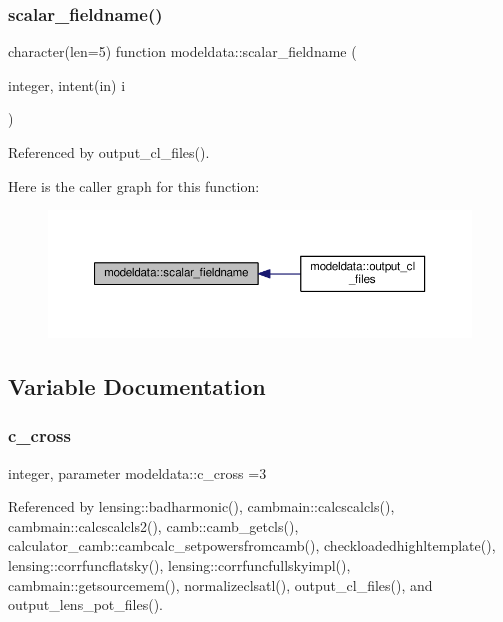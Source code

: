 \subsubsection{\texorpdfstring{scalar\+\_\+fieldname()}{scalar\_fieldname()}}
{\footnotesize\ttfamily character(len=5) function modeldata\+::scalar\+\_\+fieldname (\begin{DoxyParamCaption}\item[{integer, intent(in)}]{i }\end{DoxyParamCaption})}



Referenced by output\+\_\+cl\+\_\+files().

Here is the caller graph for this function\+:
\nopagebreak
\begin{figure}[H]
\begin{center}
\leavevmode
\includegraphics[width=350pt]{namespacemodeldata_af3439e8b84f5875f131343636aa8adee_icgraph}
\end{center}
\end{figure}


\subsection{Variable Documentation}
\mbox{\label{namespacemodeldata_a3b2071eab09222beb5e8e06ccd8764f3}} 
\subsubsection{\texorpdfstring{c\+\_\+cross}{c\_cross}}
{\footnotesize\ttfamily integer, parameter modeldata\+::c\+\_\+cross =3}



Referenced by lensing\+::badharmonic(), cambmain\+::calcscalcls(), cambmain\+::calcscalcls2(), camb\+::camb\+\_\+getcls(), calculator\+\_\+camb\+::cambcalc\+\_\+setpowersfromcamb(), checkloadedhighltemplate(), lensing\+::corrfuncflatsky(), lensing\+::corrfuncfullskyimpl(), cambmain\+::getsourcemem(), normalizeclsatl(), output\+\_\+cl\+\_\+files(), and output\+\_\+lens\+\_\+pot\+\_\+files().

